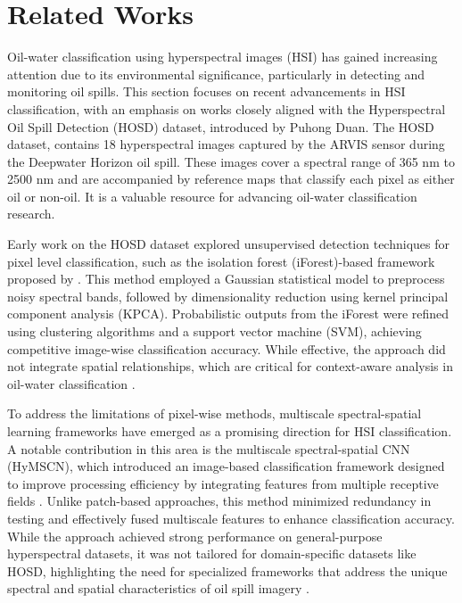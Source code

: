 \section{Related Works}
Oil-water classification using hyperspectral images (HSI) has gained increasing attention due to its environmental significance, particularly in detecting and monitoring oil spills. This section focuses on recent advancements in HSI classification, with an emphasis on works closely aligned with the Hyperspectral Oil Spill Detection (HOSD) dataset, introduced by Puhong Duan.\cite{duan2023hosd}
\newline
The HOSD dataset, contains 18 hyperspectral images captured by the ARVIS sensor during the Deepwater Horizon oil spill. These images cover a spectral range of 365 nm to 2500 nm and are accompanied by reference maps that classify each pixel as either oil or non-oil. It is a valuable resource for advancing oil-water classification research.

Early work on the HOSD dataset explored unsupervised detection techniques for pixel level classification, such as the isolation forest (iForest)-based framework proposed by \cite{duan2023hosd}. This method employed a Gaussian statistical model to preprocess noisy spectral bands, followed by dimensionality reduction using kernel principal component analysis (KPCA). Probabilistic outputs from the iForest were refined using clustering algorithms and a support vector machine (SVM), achieving competitive image-wise classification accuracy. While effective, the approach did not integrate spatial relationships, which are critical for context-aware analysis in oil-water classification \cite{duan2023hosd}.

To address the limitations of pixel-wise methods, multiscale spectral-spatial learning frameworks have emerged as a promising direction for HSI classification. A notable contribution in this area is the multiscale spectral-spatial CNN (HyMSCN), which introduced an image-based classification framework designed to improve processing efficiency by integrating features from multiple receptive fields \cite{xu2021hymscn}. Unlike patch-based approaches, this method minimized redundancy in testing and effectively fused multiscale features to enhance classification accuracy. While the approach achieved strong performance on general-purpose hyperspectral datasets, it was not tailored for domain-specific datasets like HOSD, highlighting the need for specialized frameworks that address the unique spectral and spatial characteristics of oil spill imagery \cite{xu2021hymscn}.

